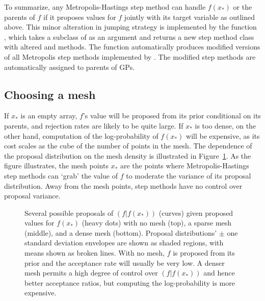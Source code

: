 \documentclass[article]{jss}
\begin{document}
\smallskip

To summarize, any Metropolis-Hastings step method can handle $f(x_*)$ or the parents of $f$ if it proposes values for $f$ jointly with its target variable as outlined above. This minor alteration in jumping strategy is implemented by the function \\, which takes a subclass of  as an argument and returns a new step method class with altered  and  methods. The function automatically produces modified versions of all Metropolis step methods implemented by  \citep{pymc}. The modified step methods are automatically assigned to parents of GPs.

\subsection{Choosing a mesh} 
\label{sec:mesh-choice} 
If $x_*$ is an empty array, $f$'s value will be proposed from its prior conditional on its parents, and rejection rates are likely to be quite large. If $x_*$ is too dense, on the other hand, computation of the log-probability of $f(x_*)$ will be expensive, as its cost scales as the cube of the number of points in the mesh. The dependence of the proposal distribution on the mesh density is illustrated in Figure~\ref{fig:meshpropose}. As the figure illustrates, the mesh points $x_*$ are the points where Metropolis-Hastings step methods can `grab' the value of $f$ to moderate the variance of its proposal distribution. Away from the mesh points, step methods have no control over proposal variance.

\begin{figure}
    \centering
    \caption{Several possible proposals of $(f|f(x_*))$ (curves) given proposed values for $f(x_*)$ (heavy dots) with no mesh (top), a sparse mesh (middle), and a dense mesh (bottom). Proposal distributions'  $\pm$ one standard deviation envelopes are shown as shaded regions, with means shown as broken lines. With no mesh, $f$ is proposed from its prior and the acceptance rate will usually be very low. A denser mesh permits a high degree of control over $(f|f(x_*))$ and hence better acceptance ratios, but computing the log-probability is more expensive.}
    \label{fig:meshpropose}
\end{figure}
\end{document}
